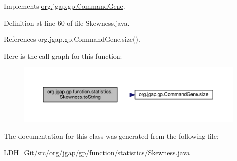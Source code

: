 Implements \hyperlink{classorg_1_1jgap_1_1gp_1_1_command_gene_a236141d99059da808afe7a9217e411c7}{org.\-jgap.\-gp.\-Command\-Gene}.



Definition at line 60 of file Skewness.\-java.



References org.\-jgap.\-gp.\-Command\-Gene.\-size().



Here is the call graph for this function\-:
\nopagebreak
\begin{figure}[H]
\begin{center}
\leavevmode
\includegraphics[width=350pt]{classorg_1_1jgap_1_1gp_1_1function_1_1statistics_1_1_skewness_a02c2eea50138710d0526056df12cc86e_cgraph}
\end{center}
\end{figure}




The documentation for this class was generated from the following file\-:\begin{DoxyCompactItemize}
\item 
L\-D\-H\-\_\-\-Git/src/org/jgap/gp/function/statistics/\hyperlink{_skewness_8java}{Skewness.\-java}\end{DoxyCompactItemize}
